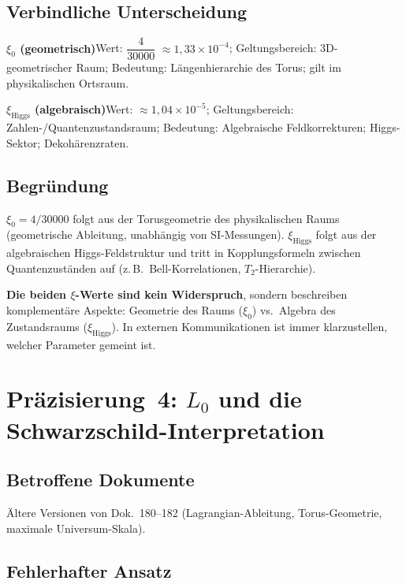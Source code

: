 \subsection*{Verbindliche Unterscheidung}

\smallskip\noindent \textbf{$\xi_0$ (geometrisch)}\quad Wert: $\dfrac{4}{30000}$ $\approx 1{,}33 \times 10^{-4}$; Geltungsbereich: 3D-geometrischer Raum; Bedeutung: Längenhierarchie des Torus; gilt im physikalischen Ortsraum.

\smallskip\noindent \textbf{$\xi_{\text{Higgs}}$ (algebraisch)}\quad Wert: $\approx 1{,}04 \times 10^{-5}$; Geltungsbereich: Zahlen-/Quantenzustandsraum; Bedeutung: Algebraische Feldkorrekturen; Higgs-Sektor; Dekohärenzraten.

\medskip


\subsection*{Begründung}

$\xi_0 = 4/30000$ folgt aus der Torusgeometrie des physikalischen Raums
(geometrische Ableitung, unabhängig von SI-Messungen). $\xi_{\text{Higgs}}$
folgt aus der algebraischen Higgs-Feldstruktur und tritt in Kopplungsformeln
zwischen Quantenzuständen auf (z.\,B.\ Bell-Korrelationen, $T_2$-Hierarchie).

\textbf{Die beiden $\xi$-Werte sind kein Widerspruch}, sondern beschreiben
komplementäre Aspekte: Geometrie des Raums ($\xi_0$) vs.\ Algebra des
Zustandsraums ($\xi_{\text{Higgs}}$). In externen Kommunikationen ist immer
klarzustellen, welcher Parameter gemeint ist.

\section{\texorpdfstring{Präzisierung~4: $L_0$ und die Schwarzschild-Interpretation}{Praezisierung 4: L0 und die Schwarzschild-Interpretation}}

\subsection*{Betroffene Dokumente}

Ältere Versionen von Dok.~180--182 (Lagrangian-Ableitung, Torus-Geometrie,
maximale Universum-Skala).

\subsection*{Fehlerhafter Ansatz}

